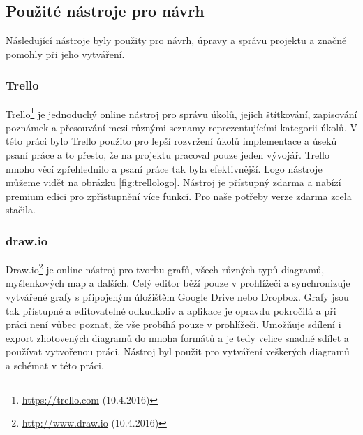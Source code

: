 \documentclass[czech,master,public,dept460,male,java,cpdeclaration]{diploma}
\begin{document}



\subsection{Použité nástroje pro návrh}
Následující nástroje byly použity pro návrh, úpravy a správu projektu a značně pomohly při jeho vytváření.
\subsubsection{Trello}
Trello\footnote{\url{https://trello.com} (10.4.2016)} je jednoduchý online nástroj pro správu úkolů, jejich štítkování, zapisování poznámek a přesouvání
mezi různými seznamy reprezentujícími kategorii úkolů. V této práci bylo Trello použito pro lepší
rozvržení úkolů implementace a úseků psaní práce a to přesto, že na projektu pracoval pouze jeden vývojář.
Trello mnoho věcí zpřehlednilo a psaní práce tak byla efektivnější. Logo nástroje můžeme vidět
na obrázku \ref{fig:trellologo}. Nástroj je přístupný zdarma a nabízí premium edici pro zpřístupnění
více funkcí. Pro naše potřeby verze zdarma zcela stačila.

\subsubsection{draw.io}
Draw.io\footnote{\url{http://www.draw.io} (10.4.2016)} je online nástroj pro tvorbu grafů,
všech různých typů diagramů, myšlenkových map a dalších.
Celý editor běží pouze v prohlížeči a synchronizuje vytvářené grafy s připojeným úložištěm
Google Drive nebo Dropbox. Grafy jsou tak přístupné  a editovatelné odkudkoliv a aplikace
je opravdu pokročilá a při práci není vůbec poznat, že vše probíhá pouze v prohlížeči.
Umožňuje sdílení i export zhotovených diagramů do mnoha formátů a je tedy velice snadné
sdílet a používat vytvořenou práci.
Nástroj byl použit pro vytváření veškerých diagramů a schémat v této práci.
\end{document}
